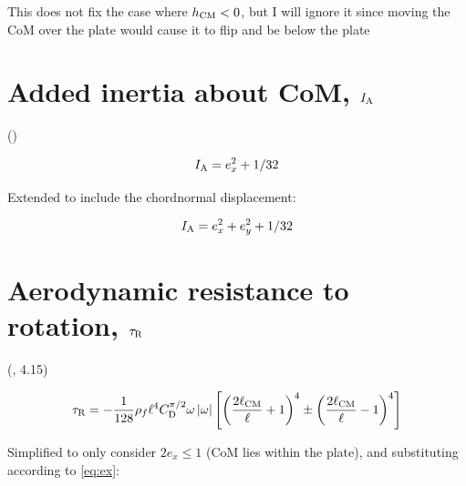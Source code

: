 \documentclass[draft]{jfm} %
\begin{document}
This does not fix the case where $h_{\textup{CM}}<0$, but I will ignore it since moving the CoM over the plate would cause it to flip and be below the plate





\section{Added inertia about CoM, $I_{\textnormal{A}}$} \label{sec:inertia}
(\cite{certini2023alsomitra})

\begin{equation}
 I_{\textnormal{A}} = e_x^2 + 1/32
\end{equation}

Extended to include the chordnormal displacement:

\begin{equation}
 I_{\textnormal{A}} = e_x^2 +e_y^2 + 1/32
\end{equation}


\section{Aerodynamic resistance to rotation, $\tau_\textnormal{R}$} \label{sec:t1}
(\cite{Li2022model}, 4.15)

\begin{equation}
\tau_\textnormal{R} = -\frac{1}{128}\rho_f\ell^4 C_{\textup{D}}^{\pi /2} \omega  \left| \omega \right| \left [ \left ( \frac{2\ell_{\textup{CM}}}{\ell}+1 \right )^4 \pm \left ( \frac{2\ell_{\textup{CM}}}{\ell}-1 \right )^4\right ]
\end{equation}

Simplified to only consider $2e_x  \leq  1$ (CoM lies within the plate), and substituting according to \ref{eq:ex}:
\end{document}
